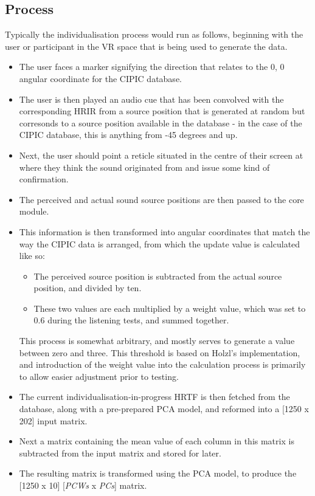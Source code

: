 \subsection{Process}
Typically the individualisation process would run as follows, beginning with the user or participant in the VR space that is being used to generate the data. 

\begin{itemize}
\item The user faces a marker signifying the direction that relates to the 0, 0 angular coordinate for the CIPIC database.
\item The user is then played an audio cue that has been convolved with the corresponding HRIR from a source position that is generated at random but corresonds to a source position available in the database - in the case of the CIPIC database, this is anything from -45 degrees and up.
\item  Next, the user should point a reticle situated in the centre of their screen at where they think the sound originated from and issue some kind of confirmation. 
\item The perceived and actual sound source positions are then passed to the core module.
\item This information is then transformed into angular coordinates that match the way the CIPIC data is arranged, from which the update value is calculated like so:
\begin{itemize}
\item The perceived source position is subtracted from the actual source position, and divided by ten. 
\item These two values are each multiplied by a weight value, which was set to 0.6 during the listening tests, and summed together. 
\end{itemize}
This process is somewhat arbitrary, and mostly serves to generate a value between zero and three. This threshold is based on Holzl's implementation, and introduction of the weight value into the calculation process is primarily to allow easier adjustment prior to testing. 
\item The current individualisation-in-progress HRTF is then fetched from the database, along with a pre-prepared PCA model, and reformed into a [1250 x 202] input matrix. 
\item Next a matrix containing the mean value of each column in this matrix is subtracted from the input matrix and stored for later. 
\item The resulting matrix is transformed using the PCA model, to produce the [1250 x 10] [\textit{PCWs} x \textit{PCs}] matrix. 

\end{itemize}
